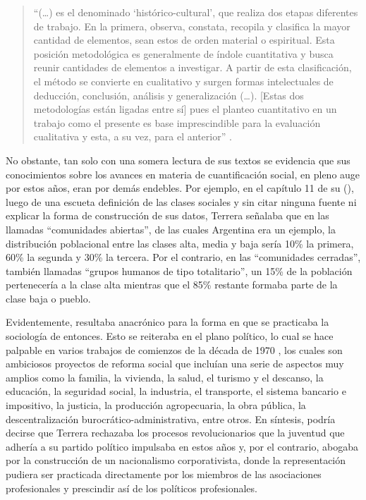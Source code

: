 \begin{quote}
\enquote{(\dots) es el denominado \enquote{histórico-cultural}, que realiza dos etapas diferentes de trabajo. En la primera, observa, constata, recopila y clasifica la mayor cantidad de elementos, sean estos de orden material o espiritual. Esta posición metodológica es generalmente de índole cuantitativa y busca reunir cantidades de elementos a investigar. A partir de esta clasificación, el método se convierte en cualitativo y surgen formas intelectuales de deducción, conclusión, análisis y generalización (\dots). [Estas dos metodologías están ligadas entre sí] pues el planteo cuantitativo en un trabajo como el presente es base imprescindible para la evaluación cualitativa y esta, a su vez, para el anterior} \parencite[39]{1921-TERRERA1968}.
\end{quote}

No obstante, tan solo con una somera lectura de sus textos se evidencia que sus conocimientos sobre los avances en materia de cuantificación social, en pleno auge por estos años, eran por demás endebles. Por ejemplo, en el capítulo 11 de su  (\citeyear{1716-TERRERA1969}), luego de una escueta definición de las clases sociales y sin citar ninguna fuente ni explicar la forma de construcción de sus datos, Terrera señalaba que en las llamadas \enquote{comunidades abiertas}, de las cuales Argentina era un ejemplo, la distribución poblacional entre las clases alta, media y baja sería 10\% la primera, 60\% la segunda y 30\% la tercera. Por el contrario, en las \enquote{comunidades cerradas}, también llamadas \enquote{grupos humanos de tipo totalitario}, un 15\% de la población pertenecería a la clase alta mientras que el 85\% restante formaba parte de la clase baja o pueblo.

Evidentemente, resultaba anacrónico para la forma en que se practicaba la sociología de entonces. Esto se reiteraba en el plano político, lo cual se hace palpable en varios trabajos de comienzos de la década de 1970 \parencite{1717-TERRERA1970,1718-TERRERA1971,1719-TERRERA1972,1720-TERRERA1973}, los cuales son ambiciosos proyectos de reforma social que incluían una serie de aspectos muy amplios como la familia, la vivienda, la salud, el turismo y el descanso, la educación, la seguridad social, la industria, el transporte, el sistema bancario e impositivo, la justicia, la producción agropecuaria, la obra pública, la descentralización burocrático-administrativa, entre otros. En síntesis, podría decirse que Terrera rechazaba los procesos revolucionarios que la juventud que adhería a su partido político impulsaba en estos años y, por el contrario, abogaba por la construcción de un nacionalismo corporativista, donde la representación pudiera ser practicada directamente por los miembros de las asociaciones profesionales y prescindir así de los políticos profesionales.

